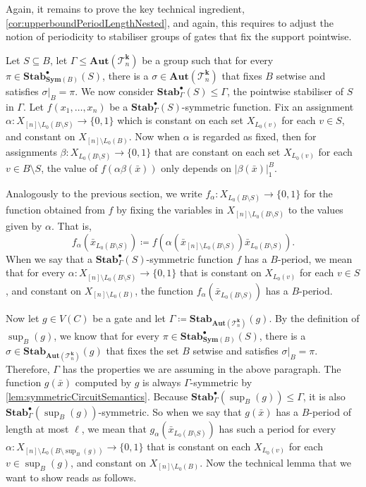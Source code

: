 \documentclass[11pt]{article}
\DeclareMathOperator{\supp}{sup}
\newcommand{\Aut}{\mathbf{Aut}}
\newcommand{\Sym}{\mathbf{Sym}}
\newcommand{\Stab}{\mathbf{Stab}}
\newcommand{\StabP}{\mathbf{Stab}^{\bullet}}
\newcommand{\Tt}{{\mathcal T}}
\theoremstyle{definition}
\theoremstyle{plain}
\theoremstyle{remark}
\theoremstyle{remark}
\begin{document}
Again, it remains to prove the key technical ingredient, \cref{cor:upperboundPeriodLengthNested}, and again, this requires to adjust the notion of periodicity to stabiliser groups of gates that fix the support pointwise.


Let $S \subseteq B$, let $\Gamma \leq \Aut(\Tt_n^{\boldsymbol{k}})$ be a group such that for every $\pi \in \StabP_{\Sym(B)}(S)$, there is a $\sigma \in \Aut(\Tt_n^{\boldsymbol{k}})$ that fixes $B$ setwise and satisfies $\sigma|_B = \pi$. We now consider $\StabP_\Gamma(S) \leq \Gamma$, the pointwise stabiliser of $S$ in $\Gamma$. 
Let $f(x_1, \dots, x_n)$ be a $\StabP_\Gamma(S)$-symmetric function.
Fix an assignment $\alpha \colon X_{[n] \setminus L_0(B \setminus S)} \to \{0,1\}$ which is constant on each set $X_{L_0(v)}$ for each $v \in S$, and constant on $X_{[n] \setminus L_0(B)}$.
Now when $\alpha$ is regarded as fixed, then for assignments $\beta \colon X_{L_0(B \setminus S)} \to \{0,1\}$ that are constant on each set $X_{L_0(v)}$ for each $v \in B \setminus S$, the value of $f(\alpha\beta(\bar{x}))$ only depends on $|\beta(\bar{x})|_{1}^B$.    

Analogously to the previous section, we write $f_\alpha \colon X_{L_0(B \setminus S)} \to \{0,1\}$ for the function obtained from $f$ by fixing the variables in $X_{[n] \setminus L_0(B \setminus S)}$ to the values given by $\alpha$. That is, \[
f_\alpha(\bar{x}_{L_0(B \setminus S)}) \coloneqq f(\alpha(\bar{x}_{[n] \setminus L_0(B \setminus S)})\bar{x}_{L_0(B \setminus S)}).
\]
When we say that a $\StabP_\Gamma(S)$-symmetric function $f$ has a $B$-period, we mean that for every $\alpha \colon  X_{[n] \setminus L_0(B \setminus S)}  \to \{0,1\}$ that is constant on $X_{L_0(v)}$ for each $v \in S$, and constant on $X_{[n] \setminus L_0(B)}$, the function $f_\alpha(\bar{x}_{L_0(B \setminus S)})$ has a $B$-period. 

Now let $g \in V(C)$ be a gate and let $\Gamma \coloneqq \Stab_{\Aut(\Tt_n^{\boldsymbol{k}})}(g)$. 
By the definition of $\supp_{B}(g)$, we know that for every $\pi \in \StabP_{\Sym(B)}(S)$, there is a $\sigma \in \Stab_{\Aut(\Tt_n^{\boldsymbol{k}})}(g)$ that fixes the set $B$ setwise and satisfies $\sigma|_B = \pi$. Therefore, $\Gamma$ has the properties we are assuming in the above paragraph.
The function $g(\bar{x})$ computed by $g$ is always $\Gamma$-symmetric by \cref{lem:symmetricCircuitSemantics}. Because $\StabP_\Gamma(\supp_{B}(g)) \leq \Gamma$, it is also $\StabP_\Gamma(\supp_{B}(g))$-symmetric. So when we say that $g(\bar{x})$ has a $B$-period of length at most $\ell$, we mean that $g_\alpha(\bar{x}_{L_0(B \setminus S)})$ has such a period for every $\alpha \colon X_{[n] \setminus L_0(B \setminus \supp_{B}(g))} \to \{0,1\}$ that is constant on each $X_{L_0(v)}$ for each $v \in \supp_{B}(g)$, and constant on $X_{[n] \setminus L_0(B)}$.
Now the technical lemma that we want to show reads as follows. 
\end{document}
